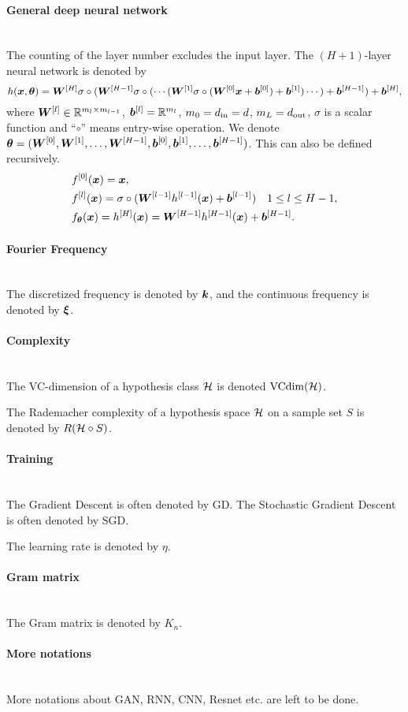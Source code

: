 \documentclass[]{report}
\begin{document}
\paragraph{General deep neural network}~\\
The counting of the layer number excludes the input layer. The $(H+1)$-layer neural network is denoted by
\begin{equation}
    h(\bm{x},\bm{\theta}) = \bm{W}^{[H]} \sigma\circ(\bm{W}^{[H-1]}\sigma\circ(\cdots (\bm{W}^{[1]} \sigma\circ(\bm{W}^{[0]} \bm{x} + \bm{b}^{[0]} ) + \bm{b}^{[1]} )\cdots)+\bm{b}^{[H-1]})+\bm{b}^{[H]},
\end{equation}
where $\bm{W}^{[l]} \in \mathbb{R}^{m_{l}\times m_{l-1}}$, $\bm{b}^{[l]}=\mathbb{R}^{m_{l}}$, $m_0=d_{\rm in}=d$, $m_L=d_{\rm out}$,
$\sigma$ is a scalar function and ``$\circ$'' means entry-wise operation. 
We denote $\bm{\theta}=(\bm{W}^{[0]},\bm{W}^{[1]},\ldots,\bm{W}^{[H-1]},\bm{b}^{[0]},\bm{b}^{[1]},\ldots,\bm{b}^{[H-1]})$. This can also be defined recursively.
\begin{align}
    &f^{[0]}(\bm{x})=\bm{x}, \\
    &f^{[l]}(\bm{x})=\sigma\circ(\bm{W}^{[l-1]} h^{[l-1]}(\bm{x}) + \bm{b}^{[l-1]}) \quad 1\leq l\leq H-1,\\
    &f_{\bm{\theta}}(\bm{x})=h^{[H]}(\bm{x})=\bm{W}^{[H-1]} h^{[H-1]}(\bm{x}) + \bm{b}^{[H-1]}.
\end{align}

\paragraph{Fourier Frequency}~\\
The discretized frequency is denoted by $\bm{k}$, and the continuous frequency is denoted by $\bm{\xi}$.
\paragraph{Complexity}~\\
The VC-dimension of a hypothesis class $\mathcal{H}$ is denoted ${\rm VCdim}(\mathcal{H})$.

The Rademacher complexity of a hypothesis space $\mathcal{H}$ on a sample set $S$ is denoted by $R (\mathcal{H}\circ S)$.

\paragraph{Training}~\\
The Gradient Descent is often denoted by GD. The Stochastic Gradient Descent is often denoted by SGD. 

The learning rate is denoted by $\eta$.

\paragraph{Gram matrix}~\\
The Gram matrix is denoted by $K_n$.

\paragraph{More notations}~\\
More notations about GAN, RNN, CNN, Resnet etc. are left to be done.
\end{document}
